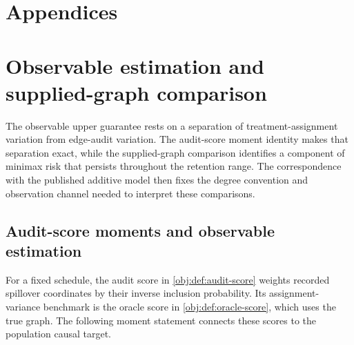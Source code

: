 \documentclass[11pt]{article}
\begin{document}
\appendix

\section*{Appendices}

\section{Observable estimation and supplied-graph comparison}

The observable upper guarantee rests on a separation of treatment-assignment variation from edge-audit variation. The audit-score moment identity makes that separation exact, while the supplied-graph comparison identifies a component of minimax risk that persists throughout the retention range. The correspondence with the published additive model then fixes the degree convention and observation channel needed to interpret these comparisons.

\subsection{Audit-score moments and observable estimation}

For a fixed schedule, the audit score in \cref{obj:def:audit-score} weights recorded spillover coordinates by their inverse inclusion probability. Its assignment-variance benchmark is the oracle score in \cref{obj:def:oracle-score}, which uses the true graph. The following moment statement connects these scores to the population causal target.
\end{document}
